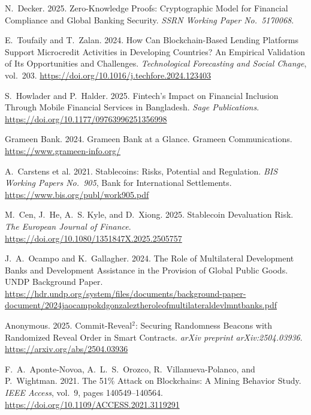 \documentclass[12pt,a4paper]{report}
\begin{document}
{\begin{enumerate}[label={[\arabic*]}]
\item N.~Decker. 2025. Zero-Knowledge Proofs: Cryptographic Model for Financial Compliance and Global Banking Security. \emph{SSRN Working Paper No.~5170068}.

\item E.~Toufaily and T.~Zalan. 2024. How Can Blockchain-Based Lending Platforms Support Microcredit Activities in Developing Countries? An Empirical Validation of Its Opportunities and Challenges. \emph{Technological Forecasting and Social Change}, vol.~203. \url{https://doi.org/10.1016/j.techfore.2024.123403}

\item S.~Howlader and P.~Halder. 2025. Fintech's Impact on Financial Inclusion Through Mobile Financial Services in Bangladesh. \emph{Sage Publications}. \url{https://doi.org/10.1177/09763996251356998}

\item Grameen Bank. 2024. Grameen Bank at a Glance. Grameen Communications. \url{https://www.grameen-info.org/}

\item A.~Carstens et al. 2021. Stablecoins: Risks, Potential and Regulation. \emph{BIS Working Papers No.~905}, Bank for International Settlements. \url{https://www.bis.org/publ/work905.pdf}

\item M.~Cen, J.~He, A.~S. Kyle, and D.~Xiong. 2025. Stablecoin Devaluation Risk. \emph{The European Journal of Finance}. \url{https://doi.org/10.1080/1351847X.2025.2505757}

\item J.~A.~Ocampo and K.~Gallagher. 2024. The Role of Multilateral Development Banks and Development Assistance in the Provision of Global Public Goods. UNDP Background Paper. \url{https://hdr.undp.org/system/files/documents/background-paper-document/2024jaocampokdgonzaleztheroleofmultilateraldevlmntbanks.pdf}

\item Anonymous. 2025. Commit-Reveal$^2$: Securing Randomness Beacons with Randomized Reveal Order in Smart Contracts. \emph{arXiv preprint arXiv:2504.03936}. \url{https://arxiv.org/abs/2504.03936}

\item F.~A.~Aponte-Novoa, A.~L.~S.~Orozco, R.~Villanueva-Polanco, and P.~Wightman. 2021. The 51\% Attack on Blockchains: A Mining Behavior Study. \emph{IEEE Access}, vol.~9, pages 140549--140564. \url{https://doi.org/10.1109/ACCESS.2021.3119291}


\end{enumerate}}
\end{document}
